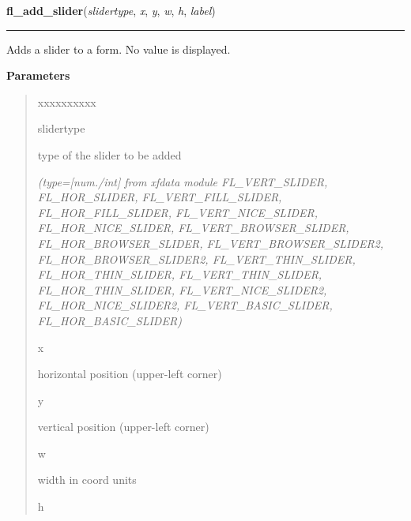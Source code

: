     \label{xformslib:library:fl_add_slider}

    \vspace{0.5ex}

\hspace{.8\funcindent}\begin{boxedminipage}{\funcwidth}

    \raggedright \textbf{fl\_add\_slider}(\textit{slidertype}, \textit{x}, \textit{y}, \textit{w}, \textit{h}, \textit{label})

    \vspace{-1.5ex}

    \rule{\textwidth}{0.5\fboxrule}
\setlength{\parskip}{2ex}
    Adds a slider to a form. No value is displayed.

\setlength{\parskip}{1ex}
      \textbf{Parameters}
      \vspace{-1ex}

      \begin{quote}
        \begin{Ventry}{xxxxxxxxxx}

          \item[slidertype]

          type of the slider to be added

            {\it (type=[num./int] from xfdata module FL\_VERT\_SLIDER, FL\_HOR\_SLIDER, 
FL\_VERT\_FILL\_SLIDER, FL\_HOR\_FILL\_SLIDER, FL\_VERT\_NICE\_SLIDER, 
FL\_HOR\_NICE\_SLIDER, FL\_VERT\_BROWSER\_SLIDER, FL\_HOR\_BROWSER\_SLIDER,
FL\_VERT\_BROWSER\_SLIDER2, FL\_HOR\_BROWSER\_SLIDER2, 
FL\_VERT\_THIN\_SLIDER, FL\_HOR\_THIN\_SLIDER, FL\_VERT\_THIN\_SLIDER, 
FL\_HOR\_THIN\_SLIDER, FL\_VERT\_NICE\_SLIDER2, FL\_HOR\_NICE\_SLIDER2, 
FL\_VERT\_BASIC\_SLIDER, FL\_HOR\_BASIC\_SLIDER)}

          \item[x]

          horizontal position (upper-left corner)

          \item[y]

          vertical position (upper-left corner)

          \item[w]

          width in coord units

          \item[h]


\end{Ventry}
\end{quote}
\end{boxedminipage}
